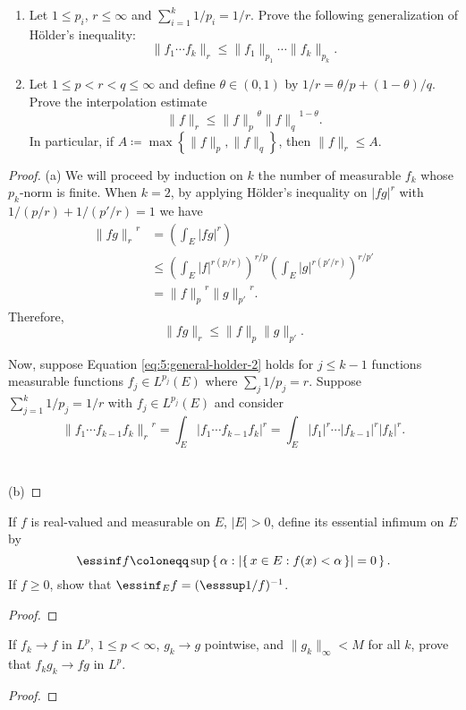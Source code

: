 \begin{problem}
\begin{enumerate}[label=(\alph*)]
\item Let $1\leq p_i$, $r\leq\infty$ and $\sum_{i=1}^k1/p_i=1/r$. Prove the
  following generalization of Hölder's inequality:
\[
\|f_1\dotsm f_k\|_r\leq\|f_1\|_{p_1}\dotsm\|f_k\|_{p_k}.
\]
\item Let $1\leq p<r<q\leq\infty$ and define $\theta\in(0,1)$ by
  $1/r=\theta/p+(1-\theta)/q$. Prove the interpolation estimate
\[
\|f\|_r\leq{\|f\|_p}^\theta{\|f\|_q}^{1-\theta}.
\]
In particular, if $A\coloneqq\max\left\{\|f\|_p,\|f\|_q\right\}$, then
$\|f\|_r\leq A$.
\end{enumerate}
\end{problem}
\begin{proof}
(a) We will proceed by induction on $k$ the number of measurable $f_k$
whose $p_k$-norm is finite. When $k=2$, by applying Hölder's inequality on
$|fg|^r$ with $1/(p/r)+1/(p'/r)=1$ we have
\begin{align*}
{\|fg\|_r}^r
&=\left(\int_E|fg|^r\right)\\
&\leq\left(\int_E|f|^{r(p/r)}\right)^{r/p}\left(\int_E|g|^{r(p'/r)}\right)^{r/p'}\\
&={\|f\|_p}^r{\|g\|_{p'}}^r.
\end{align*}
Therefore,
\begin{equation}
  \label{eq:5:general-holder-2}
{\|fg\|_r}\leq\|f\|_p\|g\|_{p'}.
\end{equation}

Now, suppose Equation \eqref{eq:5:general-holder-2} holds for $j\leq k-1$
functions measurable functions $f_j\in L^{p_j}(E)$ where
$\sum_j1/p_j=r$. Suppose $\sum_{j=1}^k1/p_j=1/r$ with $f_j\in L^{p_j}(E)$
and consider
\[
{\|f_1\cdots f_{k-1}f_k\|_r}^r=\int_E|f_1\cdots
f_{k-1}f_k|^r=\int_E|f_1|^r\cdots|f_{k-1}|^r|f_k|^r.
\]
\\\\
(b)
\end{proof}
\newpage

\begin{problem}
If $f$ is real-valued and measurable on $E$, $|E|>0$, define its essential
infimum on $E$ by
\[
\essinf f\coloneqq\sup\left\{\,\alpha:\left|\{\,x\in
    E:f(x)<\alpha\,\}\right|=0\,\right\}.
\]
If $f\geq 0$, show that $\essinf_E f=(\esssup 1/f)^{-1}$.
\end{problem}
\begin{proof}
\end{proof}
\newpage

\begin{problem}
If $f_k\to f$ in $L^p$, $1\leq p<\infty$, $g_k\to g$ pointwise, and
$\|g_k\|_\infty<M$ for all $k$, prove that $f_kg_k\to fg$ in $L^p$.
\end{problem}
\begin{proof}
\end{proof}

